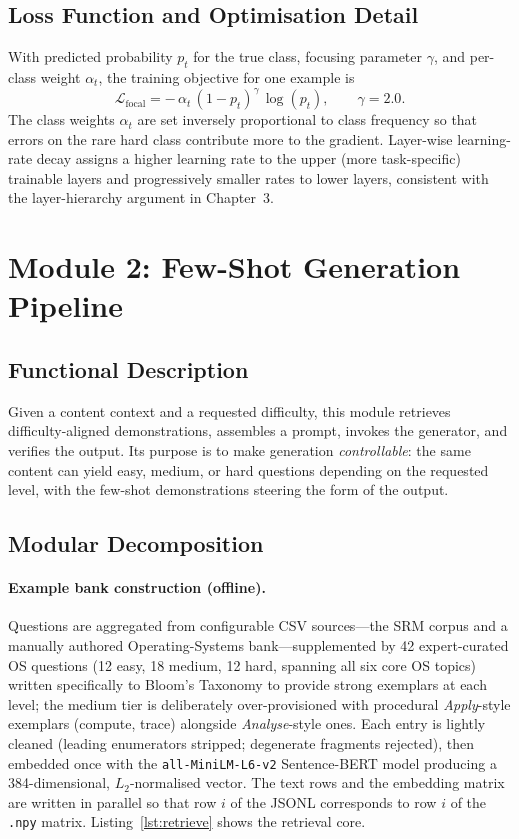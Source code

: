 \documentclass[12pt,a4paper]{report}
\begin{document}
\subsection{Loss Function and Optimisation Detail}
With predicted probability $p_t$ for the true class, focusing parameter
$\gamma$, and per-class weight $\alpha_t$, the training objective for one example
is
\begin{equation}
  \mathcal{L}_{\text{focal}} = -\,\alpha_t\,(1-p_t)^{\gamma}\,\log(p_t),
  \qquad \gamma = 2.0 .
\end{equation}
The class weights $\alpha_t$ are set inversely proportional to class frequency so
that errors on the rare hard class contribute more to the gradient. Layer-wise
learning-rate decay assigns a higher learning rate to the upper (more
task-specific) trainable layers and progressively smaller rates to lower layers,
consistent with the layer-hierarchy argument in Chapter~3.

\section{Module 2: Few-Shot Generation Pipeline}

\subsection{Functional Description}
Given a content context and a requested difficulty, this module retrieves
difficulty-aligned demonstrations, assembles a prompt, invokes the generator, and
verifies the output. Its purpose is to make generation \emph{controllable}: the
same content can yield easy, medium, or hard questions depending on the requested
level, with the few-shot demonstrations steering the form of the output.

\subsection{Modular Decomposition}
\paragraph{Example bank construction (offline).}
Questions are aggregated from configurable CSV sources---the SRM corpus and a
manually authored Operating-Systems bank---supplemented by 42 expert-curated
OS questions (12 easy, 18 medium, 12 hard, spanning all six core OS topics)
written specifically to Bloom's Taxonomy to provide strong exemplars at each
level; the medium tier is deliberately over-provisioned with procedural
\emph{Apply}-style exemplars (compute, trace) alongside \emph{Analyse}-style ones.
Each entry is lightly cleaned (leading enumerators stripped; degenerate fragments
rejected), then embedded once with the \texttt{all-MiniLM-L6-v2} Sentence-BERT model
producing a 384-dimensional, $L_2$-normalised vector. The text rows and the
embedding matrix are written in parallel so that row $i$ of the JSONL corresponds
to row $i$ of the \texttt{.npy} matrix. Listing~\ref{lst:retrieve} shows the
retrieval core.
\end{document}

